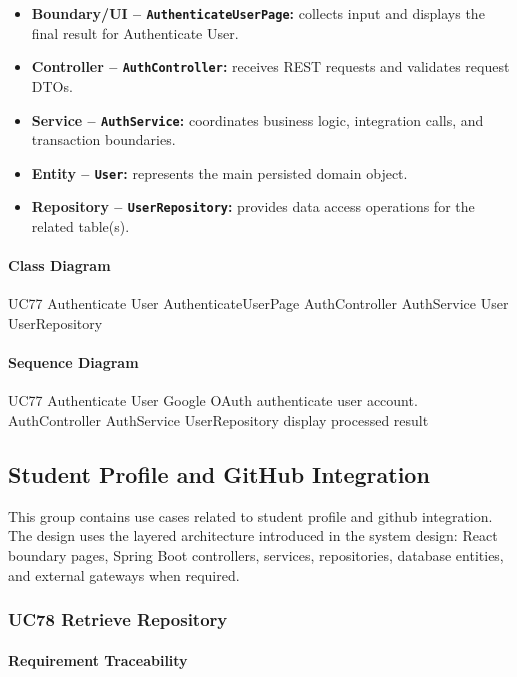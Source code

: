 \begin{itemize}
    \item \textbf{Boundary/UI -- \texttt{AuthenticateUserPage}:} collects input and displays the final result for Authenticate User.
    \item \textbf{Controller -- \texttt{AuthController}:} receives REST requests and validates request DTOs.
    \item \textbf{Service -- \texttt{AuthService}:} coordinates business logic, integration calls, and transaction boundaries.
    \item \textbf{Entity -- \texttt{User}:} represents the main persisted domain object.
    \item \textbf{Repository -- \texttt{UserRepository}:} provides data access operations for the related table(s).
\end{itemize}

\paragraph{Class Diagram}

\ClassDiagram
{UC77 Authenticate User}
{AuthenticateUserPage}
{AuthController}
{AuthService}
{User}
{UserRepository}

\paragraph{Sequence Diagram}

\SequenceDiagram
{UC77 Authenticate User}
{Google OAuth}
{authenticate user account.}
{AuthController}
{AuthService}
{UserRepository}
{display processed result}

\subsection{Student Profile and GitHub Integration}

This group contains use cases related to student profile and github integration. The design uses the layered architecture introduced in the system design: React boundary pages, Spring Boot controllers, services, repositories, database entities, and external gateways when required.

\subsubsection{UC78 Retrieve Repository}

\paragraph{Requirement Traceability}

